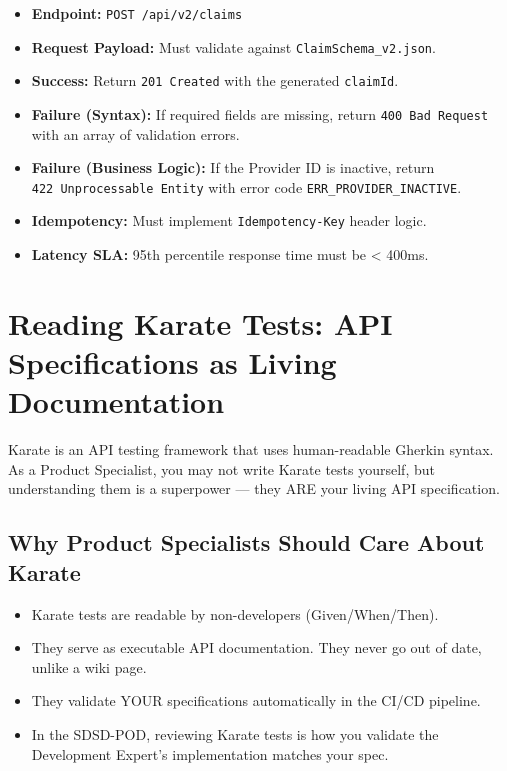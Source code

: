 \documentclass[
  11pt,
  openany,
  oneside]{book}
\providecommand{\tightlist}{%
  \setlength{\itemsep}{0pt}\setlength{\parskip}{0pt}}
\begin{document}
\begin{itemize}
\tightlist
\item
  \textbf{Endpoint:} \texttt{POST\ /api/v2/claims}
\item
  \textbf{Request Payload:} Must validate against
  \texttt{ClaimSchema\_v2.json}.
\item
  \textbf{Success:} Return \texttt{201\ Created} with the generated
  \texttt{claimId}.
\item
  \textbf{Failure (Syntax):} If required fields are missing, return
  \texttt{400\ Bad\ Request} with an array of validation errors.
\item
  \textbf{Failure (Business Logic):} If the Provider ID is inactive,
  return \texttt{422\ Unprocessable\ Entity} with error code
  \texttt{ERR\_PROVIDER\_INACTIVE}.
\item
  \textbf{Idempotency:} Must implement \texttt{Idempotency-Key} header
  logic.
\item
  \textbf{Latency SLA:} 95th percentile response time must be
  \textless{} 400ms.
\end{itemize}

\section{Reading Karate Tests: API Specifications as Living
Documentation}\label{reading-karate-tests-api-specifications-as-living-documentation}

Karate is an API testing framework that uses human-readable Gherkin
syntax. As a Product Specialist, you may not write Karate tests
yourself, but understanding them is a superpower --- they ARE your
living API specification.

\subsection{Why Product Specialists Should Care About
Karate}\label{why-product-specialists-should-care-about-karate}

\begin{itemize}
\tightlist
\item
  Karate tests are readable by non-developers (Given/When/Then).
\item
  They serve as executable API documentation. They never go out of date,
  unlike a wiki page.
\item
  They validate YOUR specifications automatically in the CI/CD pipeline.
\item
  In the SDSD-POD, reviewing Karate tests is how you validate the
  Development Expert's implementation matches your spec.
\end{itemize}
\end{document}
